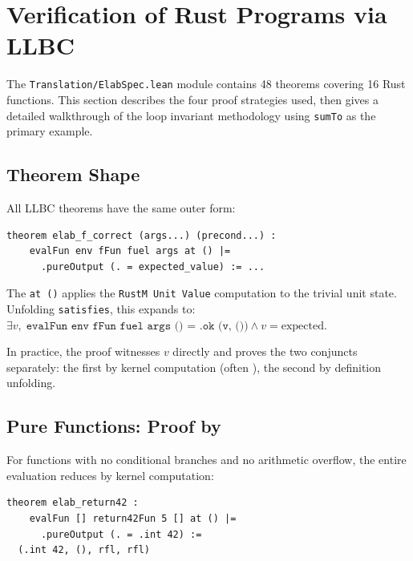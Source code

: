 
\section{Verification of Rust Programs via LLBC}
\label{sec:rust-proofs}

The \texttt{Translation/ElabSpec.lean} module contains 48 theorems covering
16 Rust functions. This section describes the four proof strategies used,
then gives a detailed walkthrough of the loop invariant methodology using
\texttt{sumTo} as the primary example.

\subsection{Theorem Shape}

All LLBC theorems have the same outer form:

\begin{lstlisting}[caption={Standard LLBC theorem shape.},label={lst:thmshape}]
theorem elab_f_correct (args...) (precond...) :
    evalFun env fFun fuel args at () |=
      .pureOutput (. = expected_value) := ...
\end{lstlisting}

The \texttt{at ()} applies the \texttt{RustM Unit Value} computation to the
trivial unit state. Unfolding \texttt{satisfies}, this expands to:
$\exists v,\; \texttt{evalFun env fFun fuel args () = .ok (v, ())} \wedge v = \text{expected}$.

In practice, the proof witnesses $v$ directly and proves the two conjuncts
separately: the first by kernel computation (often \rfl), the second by
definition unfolding.

\subsection{Pure Functions: Proof by \rfl}

For functions with no conditional branches and no arithmetic overflow, the
entire evaluation reduces by kernel computation:

\begin{lstlisting}[caption={F1: return42 is proved by rfl.},label={lst:r42proof}]
theorem elab_return42 :
    evalFun [] return42Fun 5 [] at () |=
      .pureOutput (. = .int 42) :=
  (.int 42, (), rfl, rfl)
\end{lstlisting}

